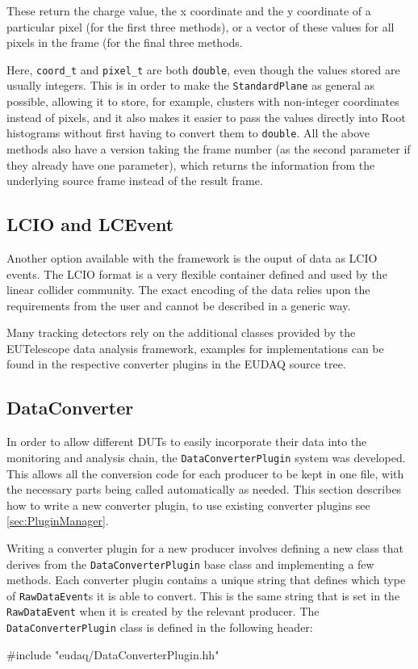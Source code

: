 These return the charge value, the x coordinate and the y coordinate of a particular pixel
(for the first three methods),
or a vector of these values for all pixels in the frame (for the final three methods.

Here, \texttt{coord\_t} and \texttt{pixel\_t} are both \texttt{double}, even though the values stored are usually integers.
This is in order to make the \texttt{StandardPlane} as general as possible, allowing it to store, for example,
clusters with non-integer coordinates instead of pixels, and it also makes it easier to pass the values directly
into Root histograms without first having to convert them to \texttt{double}.
All the above methods also have a version taking the frame number
(as the second parameter if they already have one parameter),
which returns the information from the underlying source frame instead of the result frame.

\subsection{LCIO and LCEvent}\label{sec:LCIO}
Another option available with the framework is the ouput of data as \gls{LCIO} events.
The LCIO format is a very flexible container defined and used by the linear collider community. The exact encoding of the data relies upon the requirements from the user and cannot be described in a generic way.

Many tracking detectors rely on the additional classes provided by the EUTelescope data analysis framework, examples for implementations can be found in the respective converter plugins in the EUDAQ source tree.

\subsection{DataConverter}
In order to allow different \glspl{DUT} to easily incorporate their data into the monitoring and analysis chain,
the \texttt{DataConverterPlugin} system was developed.
This allows all the conversion code for each producer to be kept in one file,
with the necessary parts being called automatically as needed.
This section describes how to write a new converter plugin,
to use existing converter plugins see \autoref{sec:PluginManager}.

Writing a converter plugin for a new producer involves defining a new class
that derives from the \texttt{DataConverterPlugin} base class and implementing a few methods.
Each converter plugin contains a unique string that defines
which type of \texttt{RawDataEvent}s it is able to convert.
This is the same string that is set in the \texttt{RawDataEvent} when it is created by the relevant producer.
The \texttt{DataConverterPlugin} class is defined in the following header:
\begin{listing}
#include "eudaq/DataConverterPlugin.hh"
\end{listing}

